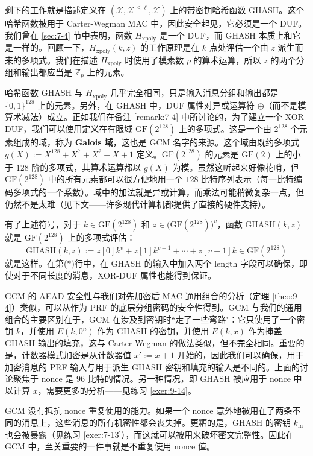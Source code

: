 \begin{snote}[GHASH。]
剩下的工作就是描述定义在 $(\mathcal{X},\mathcal{X}^{\leq\ell},\mathcal{X})$ 上的带密钥哈希函数 GHASH。这个哈希函数被用于 Carter-Wegman MAC 中，因此安全起见，它必须是一个 DUF。我们曾在 \ref{sec:7-4} 节中表明，函数 $H_\mathrm{xpoly}$ 是一个 DUF，而 GHASH 本质上和它是一样的。回顾一下，$H_\mathrm{xpoly}(k,z)$ 的工作原理是在 $k$ 点处评估一个由 $z$ 派生而来的多项式。我们在描述 $H_\mathrm{xpoly}$ 时使用了模素数 $p$ 的算术运算，所以 $z$ 的两个分组和输出都应当是 $\mathbb{Z}_p$ 上的元素。

哈希函数 GHASH 与 $H_\mathrm{xpoly}$ 几乎完全相同，只是输入消息分组和输出都是 $\{0,1\}^{128}$ 上的元素。另外，在 GHASH 中，DUF 属性对异或运算符 $\oplus$（而不是模算术减法）成立。正如我们在备注 \ref{remark:7-4} 中所讨论的，为了建立一个 XOR-DUF，我们可以使用定义在有限域 $\mathrm{GF}(2^{128})$ 上的多项式。这是一个由 $2^{128}$ 个元素组成的域，称为 \textbf{Galois 域}，这也是 GCM 名字的来源。这个域由既约多项式 $g(X):=X^{128}+X^7+X^2+X+1$ 定义。$\mathrm{GF}(2^{128})$ 的元素是 $\mathrm{GF}(2)$ 上的小于 $128$ 阶的多项式，其算术运算都以 $g(X)$ 为模。虽然这听起来好像花哨，但 $\mathrm{GF}(2^{128})$ 中的所有元素都可以很方便地用一个 $128$ 比特序列表示（每一比特编码多项式的一个系数）。域中的加法就是异或计算，而乘法可能稍微复杂一点，但仍然不是太难（见下文——许多现代计算机都提供了直接的硬件支持）。

有了上述符号，对于 $k\in\mathrm{GF}(2^{128})$ 和 $z\in\big(\mathrm{GF}(2^{128})\big)^v$，函数 $\mathrm{GHASH}(k,z)$ 就是 $\mathrm{GF}(2^{128})$ 上的多项式评估：
\begin{equation}\label{eq:9-18}
\mathrm{GHASH}(k,z):=
z[0]k^v+z[1]k^{v-1}+\cdots+z[v-1]k
\in\mathrm{GF}(2^{128})
\end{equation}
就是这样。在第($*$)行中，在 GHASH 的输入中加入两个 $\mathrm{length}$ 字段可以确保，即使对于不同长度的消息，XOR-DUF 属性也能得到保证。
\end{snote}

\begin{snote}[安全性。]
GCM 的 AEAD 安全性与我们对先加密后 MAC 通用组合的分析（定理 \ref{theo:9-4}）类似，可以从作为 PRF 的底层分组密码的安全性得到。GCM 与我们的通用组合的主要区别在于，GCM 在涉及到密钥时``走了一些弯路"：它只使用了一个密钥 $k$，并使用 $E(k,0^n)$ 作为 GHASH 的密钥，并使用 $E(k,x)$ 作为掩盖 GHASH 输出的填充，这与 Carter-Wegman 的做法类似，但不完全相同。重要的是，计数器模式加密是从计数器值 $x':=x+1$ 开始的，因此我们可以确保，用于加密消息的 PRF 输入与用于派生 GHASH 密钥和填充的输入是不同的。上面的讨论聚焦于 nonce 是 $96$ 比特的情况。另一种情况，即 GHASH 被应用于 nonce 中以计算 $x$，需要更多的分析——见练习 \ref{exer:9-14}。

GCM 没有抵抗 nonce 重复使用的能力。如果一个 nonce 意外地被用在了两条不同的消息上，这些消息的所有机密性都会丧失掉。更糟的是，GHASH 的密钥 $k_\mathrm{m}$ 也会被暴露（见练习 \ref{exer:7-13}），而这就可以被用来破坏密文完整性。因此在 GCM 中，至关重要的一件事就是不重复使用 nonce 值。
\end{snote}

